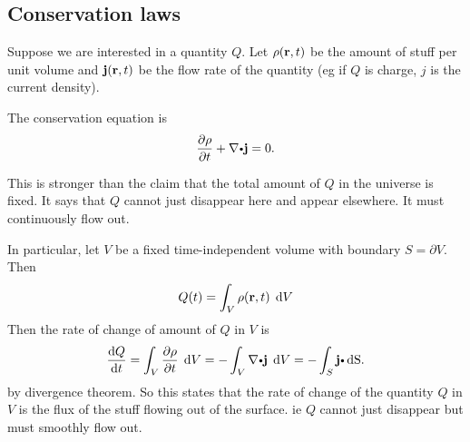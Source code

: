 

\subsection{Conservation laws}
\begin{df}
  Suppose we are interested in a quantity $Q$. Let $\rho(\mathbf{ r}, t)$ be the amount of stuff per unit volume and $\mathbf{ j}(\mathbf{ r}, t)$ be the flow rate of the quantity (eg if $Q$ is charge, $j$ is the current density).

  The conservation equation is
  \[
    \dfrac{\partial \rho}{\partial t} + \nabla\bp \vector{j} = 0.
  \]
\end{df}
This is stronger than the claim that the total amount of $Q$ in the universe is fixed. It says that $Q$ cannot just disappear here and appear elsewhere. It must continuously flow out.

In particular, let $V$ be a fixed time-independent volume with boundary $S = \partial V$. Then
\[
  Q(t) = \dint_V \rho (\vector{r}, t)\; \d V
\]
Then the rate of change of amount of $Q$ in $V$ is
\[
  \dfrac{\d Q}{\d t} = \dint_V \dfrac{\partial \rho }{\partial t}\;\d V = -\dint_V \nabla \bp \vector{j}\;\d V = -\dint_S \vector{j}\bp \d \S.
\]
by divergence theorem. So this states that the rate of change of the quantity $Q$ in $V$ is the flux of the stuff flowing out of the surface. ie $Q$ cannot just disappear but must smoothly flow out.

